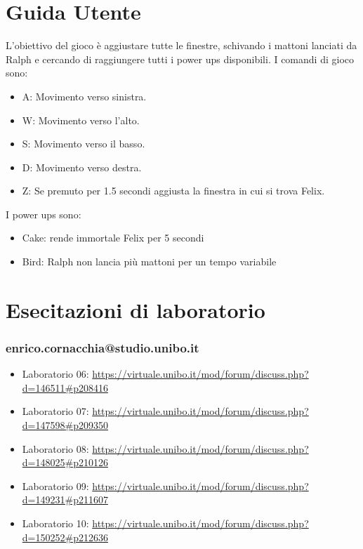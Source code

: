 \documentclass[a4paper,12pt]{report}
\begin{document}
\appendix
\chapter{Guida Utente}
L'obiettivo del gioco è aggiustare tutte le finestre, schivando i mattoni lanciati da Ralph e cercando di raggiungere tutti i power ups disponibili.
I comandi di gioco sono:
\begin{itemize}
 \item A: Movimento verso sinistra.
 \item W: Movimento verso l'alto.
 \item S: Movimento verso il basso.
 \item D: Movimento verso destra.
 \item Z: Se premuto per 1.5 secondi aggiusta la finestra in cui si trova Felix.
\end{itemize}
I power ups sono:
\begin{itemize}
 \item Cake: rende immortale Felix per 5 secondi
 \item Bird: Ralph non lancia più mattoni per un tempo variabile
\end{itemize}
\chapter{Esecitazioni di laboratorio} 

\subsection{enrico.cornacchia@studio.unibo.it}

\begin{itemize}
 \item Laboratorio 06: \url{https://virtuale.unibo.it/mod/forum/discuss.php?d=146511#p208416}
 \item Laboratorio 07: \url{https://virtuale.unibo.it/mod/forum/discuss.php?d=147598#p209350}
 \item Laboratorio 08: \url{https://virtuale.unibo.it/mod/forum/discuss.php?d=148025#p210126}
 \item Laboratorio 09: \url{https://virtuale.unibo.it/mod/forum/discuss.php?d=149231#p211607}
 \item Laboratorio 10: \url{https://virtuale.unibo.it/mod/forum/discuss.php?d=150252#p212636}
\end{itemize}
\end{document}
